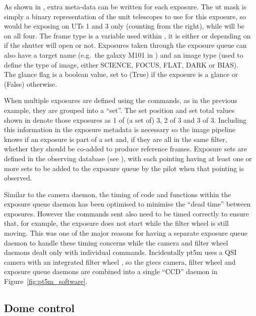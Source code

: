 \begin{colsection}
\begin{colsection}
As shown in , extra meta-data can be written for each exposure. The \gls{ut} mask is simply a binary representation of the unit telescopes to use for this exposure, so  would be exposing on UTs 1 and 3 only (counting from the right), while  will be on all four. The frame type is a variable used within , it is either  or  depending on if the shutter will open or not. Exposures taken through the exposure queue can also have a target name (e.g.\ the galaxy M101 in ) and an image type (used to define the type of image, either SCIENCE, FOCUS, FLAT, DARK or BIAS). The glance flag is a boolean value, set to  (True) if the exposure is a glance or  (False) otherwise.

When multiple exposures are defined using the  commands, as in the previous  example, they are grouped into a ``set''. The set position and set total values shown in  denote those exposures as 1 of (a set of) 3, 2 of 3 and 3 of 3. Including this information in the exposure metadata is necessary so the image pipeline knows if an exposure is part of a set and, if they are all in the same filter, whether they should be co-added to produce reference frames. Exposure sets are defined in the observing database (see ), with each pointing having at least one or more sets to be added to the exposure queue by the pilot when that pointing is observed.

Similar to the camera daemon, the timing of code and functions within the exposure queue daemon has been optimised to minimise the ``dead time'' between exposures. However the commands sent also need to be timed correctly to ensure that, for example, the exposure does not start while the filter wheel is still moving. This was one of the major reasons for having a separate exposure queue daemon to handle these timing concerns while the camera and filter wheel daemons dealt only with individual commands. Incidentally \gls{pt5m} uses a QSI camera with an integrated filter wheel \citep{pt5m}, so the \gls{gtecs} camera, filter wheel and exposure queue daemons are combined into a single ``CCD'' daemon in Figure~\ref{fig:pt5m_software}.

\end{colsection}


\subsection{Dome control}
\label{sec:dome}
\begin{colsection}


\end{colsection}
\end{colsection}
